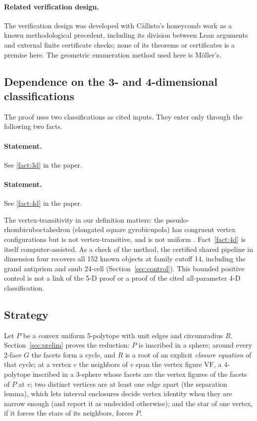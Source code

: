 \documentclass[11pt]{article}
\theoremstyle{definition}
\theoremstyle{remark}
\newcommand{\VF}{\mathrm{VF}}
\begin{document}
\paragraph{Related verification design.}
The verification design was developed with Càllisto's honeycomb work
\cite{CallistoUniform} as a known methodological precedent, including its
division between Lean arguments and external finite certificate checks;
none of its theorems or certificates is a premise here.
The geometric enumeration method used here is Möller's.

\subsection{Dependence on the 3- and 4-dimensional classifications}
\label{sec:inputs}

The proof uses two classifications as cited inputs. They enter only
through the following two facts.

\paragraph{Statement.} See \ref{fact:3d} in the paper.


\paragraph{Statement.} See \ref{fact:4d} in the paper.


The vertex-transitivity in our definition matters: the
pseudo-rhombicuboctahedron (elongated square gyrobicupola) has congruent
vertex configurations but is not vertex-transitive, and is not uniform
\cite{Grunbaum2009}. Fact~\ref{fact:4d} is itself computer-assisted. As a
check of the method, the certified shared pipeline in dimension four
recovers all 152 known objects at family cutoff 14, including the grand
antiprism and snub 24-cell (Section~\ref{sec:control}). This bounded positive control is
not a link of the 5-D proof or a proof of the cited all-parameter 4-D
classification.

\subsection{Strategy}

Let $P$ be a convex uniform 5-polytope with unit edges and circumradius
$R$. Section~\ref{sec:prelim} proves the reduction: $P$ is inscribed in a
sphere; around every 2-face $G$ the facets form a cycle, and $R$ is a root
of an explicit \emph{closure equation} of that cycle; at a vertex $v$ the
neighbors of $v$ span the vertex figure $\VF$, a 4-polytope inscribed in
a 3-sphere whose facets are the vertex figures of the facets of $P$ at
$v$; two distinct vertices are at least one edge apart (the separation
lemma), which lets interval enclosures decide vertex identity when they
are narrow enough (and report it as undecided otherwise);
and the star of one vertex, if it forces the stars of its neighbors,
forces $P$.
\end{document}
